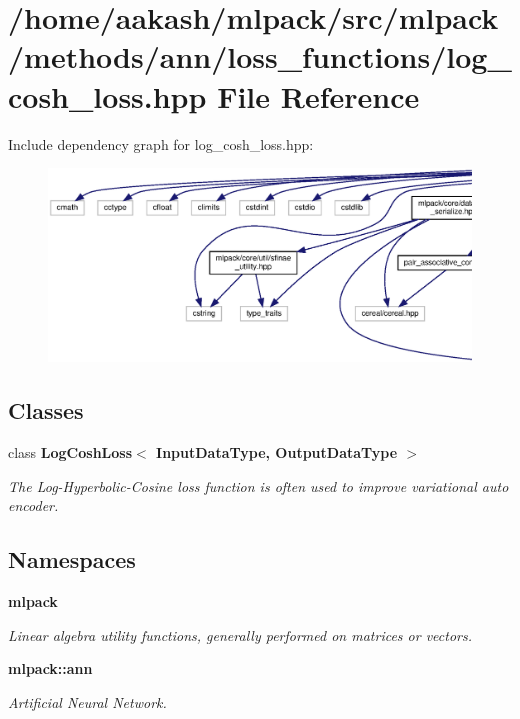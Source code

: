 \section{/home/aakash/mlpack/src/mlpack/methods/ann/loss\+\_\+functions/log\+\_\+cosh\+\_\+loss.hpp File Reference}
\label{log__cosh__loss_8hpp}
Include dependency graph for log\+\_\+cosh\+\_\+loss.\+hpp\+:
\nopagebreak
\begin{figure}[H]
\begin{center}
\leavevmode
\includegraphics[width=350pt]{log__cosh__loss_8hpp__incl}
\end{center}
\end{figure}
\subsection*{Classes}
\begin{DoxyCompactItemize}
\item 
class \textbf{ Log\+Cosh\+Loss$<$ Input\+Data\+Type, Output\+Data\+Type $>$}
\begin{DoxyCompactList}\small\item\em The Log-\/\+Hyperbolic-\/\+Cosine loss function is often used to improve variational auto encoder. \end{DoxyCompactList}\end{DoxyCompactItemize}
\subsection*{Namespaces}
\begin{DoxyCompactItemize}
\item 
 \textbf{ mlpack}
\begin{DoxyCompactList}\small\item\em Linear algebra utility functions, generally performed on matrices or vectors. \end{DoxyCompactList}\item 
 \textbf{ mlpack\+::ann}
\begin{DoxyCompactList}\small\item\em Artificial Neural Network. \end{DoxyCompactList}\end{DoxyCompactItemize}



